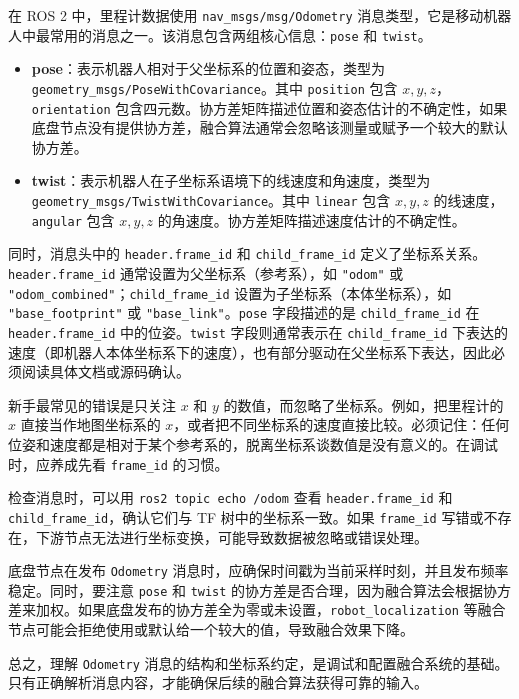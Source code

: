 \documentclass[UTF8,zihao=-4]{ctexart}
\DeclareRobustCommand{\code}[1]{\texttt{#1}}
\begin{document}
在 ROS 2 中，里程计数据使用 \code{nav\_msgs/msg/Odometry} 消息类型，它是移动机器人中最常用的消息之一。该消息包含两组核心信息：\code{pose} 和 \code{twist}。

\begin{itemize}
  \item \textbf{pose}：表示机器人相对于父坐标系的位置和姿态，类型为 \code{geometry\_msgs/PoseWithCovariance}。其中 \code{position} 包含 $x,y,z$，\code{orientation} 包含四元数。协方差矩阵描述位置和姿态估计的不确定性，如果底盘节点没有提供协方差，融合算法通常会忽略该测量或赋予一个较大的默认协方差。
  \item \textbf{twist}：表示机器人在子坐标系语境下的线速度和角速度，类型为 \code{geometry\_msgs/TwistWithCovariance}。其中 \code{linear} 包含 $x,y,z$ 的线速度，\code{angular} 包含 $x,y,z$ 的角速度。协方差矩阵描述速度估计的不确定性。
\end{itemize}

同时，消息头中的 \code{header.frame\_id} 和 \code{child\_frame\_id} 定义了坐标系关系。\code{header.frame\_id} 通常设置为父坐标系（参考系），如 \code{"odom"} 或 \code{"odom\_combined"}；\code{child\_frame\_id} 设置为子坐标系（本体坐标系），如 \code{"base\_footprint"} 或 \code{"base\_link"}。\code{pose} 字段描述的是 \code{child\_frame\_id} 在 \code{header.frame\_id} 中的位姿。\code{twist} 字段则通常表示在 \code{child\_frame\_id} 下表达的速度（即机器人本体坐标系下的速度），也有部分驱动在父坐标系下表达，因此必须阅读具体文档或源码确认。

新手最常见的错误是只关注 $x$ 和 $y$ 的数值，而忽略了坐标系。例如，把里程计的 $x$ 直接当作地图坐标系的 $x$，或者把不同坐标系的速度直接比较。必须记住：任何位姿和速度都是相对于某个参考系的，脱离坐标系谈数值是没有意义的。在调试时，应养成先看 \code{frame\_id} 的习惯。

检查消息时，可以用 \code{ros2 topic echo /odom} 查看 \code{header.frame\_id} 和 \code{child\_frame\_id}，确认它们与 TF 树中的坐标系一致。如果 \code{frame\_id} 写错或不存在，下游节点无法进行坐标变换，可能导致数据被忽略或错误处理。

底盘节点在发布 \code{Odometry} 消息时，应确保时间戳为当前采样时刻，并且发布频率稳定。同时，要注意 \code{pose} 和 \code{twist} 的协方差是否合理，因为融合算法会根据协方差来加权。如果底盘发布的协方差全为零或未设置，\code{robot\_localization} 等融合节点可能会拒绝使用或默认给一个较大的值，导致融合效果下降。

总之，理解 \code{Odometry} 消息的结构和坐标系约定，是调试和配置融合系统的基础。只有正确解析消息内容，才能确保后续的融合算法获得可靠的输入。
\end{document}
